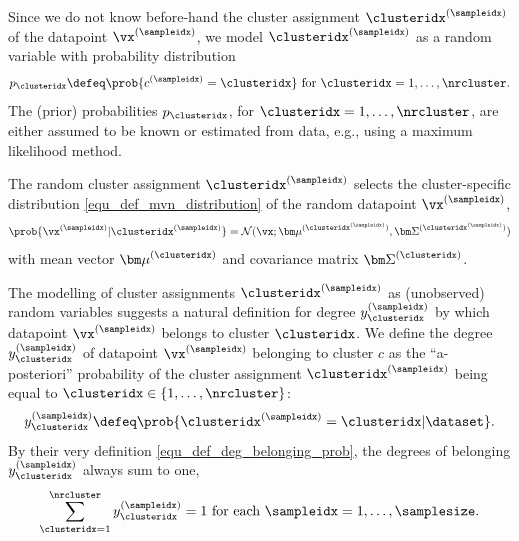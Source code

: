 \documentclass[12pt]{report}
\begin{document}
Since we do not know before-hand the cluster assignment $\clusteridx^{(\sampleidx)}$ 
of the datapoint $\vx^{(\sampleidx)}$, we model $\clusteridx^{(\sampleidx)}$ 
as a random variable with probability distribution  
\begin{equation} 
\label{equ_def_cluster_prob}
p_{\clusteridx} \defeq \prob{c^{(\sampleidx)}=\clusteridx} \mbox{ for } \clusteridx=1,\ldots,\nrcluster.
\end{equation}  
The (prior) probabilities $p_{\clusteridx}$, for $\clusteridx=1,\ldots,\nrcluster$, 
are either assumed to be known or estimated from data, e.g., using a maximum 
likelihood method. 

The random cluster assignment $\clusteridx^{(\sampleidx)}$ selects the cluster-specific 
distribution \eqref{equ_def_mvn_distribution} of the random datapoint $\vx^{(\sampleidx)}$, 
\begin{equation}
\label{equ_cond_dist_GMM}
 \prob{\vx^{(\sampleidx)} | \clusteridx^{(\sampleidx)} } = \mathcal{N} (\vx; {\bm \mu}^{(\clusteridx^{(\sampleidx)})}, {\bm \Sigma}^{(\clusteridx^{(\sampleidx)})})
\end{equation} 
with mean vector ${\bm \mu}^{(\clusteridx)}$ and covariance matrix ${\bm \Sigma}^{(\clusteridx)}$. 

The modelling of cluster assignments $\clusteridx^{(\sampleidx)}$ as 
(unobserved) random variables suggests a natural definition for degree 
$y^{(\sampleidx)}_{\clusteridx}$ by which datapoint $\vx^{(\sampleidx)}$ 
belongs to cluster $\clusteridx$. We define the degree $y^{(\sampleidx)}_{\clusteridx}$ 
of datapoint $\vx^{(\sampleidx)}$ belonging to cluster $c$ as 
the ``a-posteriori'' probability of the cluster assignment $\clusteridx^{(\sampleidx)}$ 
being equal to $\clusteridx \in \{1,\ldots,\nrcluster\}$: 
\begin{equation}
\label{equ_def_deg_belonging_prob}
y^{(\sampleidx)}_{\clusteridx} \defeq \prob{ \clusteridx^{(\sampleidx)} = \clusteridx | \dataset}.
\end{equation} 
By their very definition \eqref{equ_def_deg_belonging_prob}, 
the degrees of belonging $y^{(\sampleidx)}_{\clusteridx}$ always 
sum to one, 
\begin{equation} 
\label{equ_dob_sum_to_one}
\sum_{\clusteridx=1}^{\nrcluster} y^{(\sampleidx)}_{\clusteridx}=1 \mbox{ for each } \sampleidx=1,\ldots,\samplesize.
\end{equation}  
\end{document}
